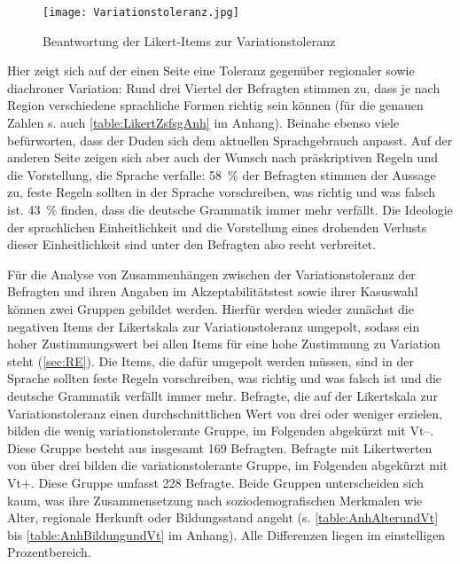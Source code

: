 \begin{figure}[htb]
\centering
\texttt{[image: Variationstoleranz.jpg]}
\caption{Beantwortung der Likert-Items zur Variationstoleranz}
\label{pic:VT}
\end{figure}

Hier zeigt sich auf der einen Seite eine Toleranz gegenüber regionaler sowie diachroner Variation: Rund drei Viertel der Befragten stimmen zu, dass je nach Region verschiedene sprachliche Formen richtig sein können (für die genauen Zahlen s. auch \autoref{table:LikertZsfsgAnh} im Anhang). Beinahe ebenso viele befürworten, dass der Duden sich dem aktuellen Sprachgebrauch anpasst. 
Auf der anderen Seite zeigen sich aber auch der Wunsch nach präskriptiven Regeln und die Vorstellung, die Sprache verfalle: 58~\% der Befragten stimmen der Aussage zu, feste Regeln sollten in der Sprache vorschreiben, was richtig und was falsch ist. 
43~\% finden, dass die deutsche Grammatik immer mehr verfällt.
Die Ideologie der sprachlichen Einheitlichkeit und die Vorstellung eines drohenden Verlusts dieser Einheitlichkeit sind unter den Befragten also recht verbreitet. 

Für die Analyse von Zusammenhängen zwischen der Variationstoleranz der Befragten und ihren Angaben im Akzeptabilitätstest sowie ihrer Kasuswahl können zwei Gruppen gebildet werden.
Hierfür werden wieder zunächst die negativen Items der Likertskala zur Variationstoleranz umgepolt, sodass ein hoher Zustimmungswert bei allen Items für eine hohe Zustimmung zu Variation steht (\autoref{sec:RE}). 
Die Items, die dafür umgepolt werden müssen, sind \glqq in der Sprache sollten feste Regeln vorschreiben, was richtig und was falsch ist\grqq{} und \glqq die deutsche Grammatik verfällt immer mehr\grqq.
Befragte, die auf der Likertskala zur Variationstoleranz einen durchschnittlichen Wert von drei oder weniger erzielen, bilden die wenig variationstolerante Gruppe, im Folgenden abgekürzt mit Vt--. 
Diese Gruppe besteht aus insgesamt 169 Befragten. 
Befragte mit Likertwerten von über drei bilden die variationstolerante Gruppe, im Folgenden abgekürzt mit Vt+. 
Diese Gruppe umfasst 228 Befragte. 
Beide Gruppen unterscheiden sich kaum, was ihre Zusammensetzung nach soziodemografischen Merkmalen wie Alter, regionale Herkunft oder Bildungsstand angeht (s. \autoref{table:AnhAlterundVt} bis \autoref{table:AnhBildungundVt} im Anhang). 
Alle Differenzen liegen im einstelligen Prozentbereich. 
